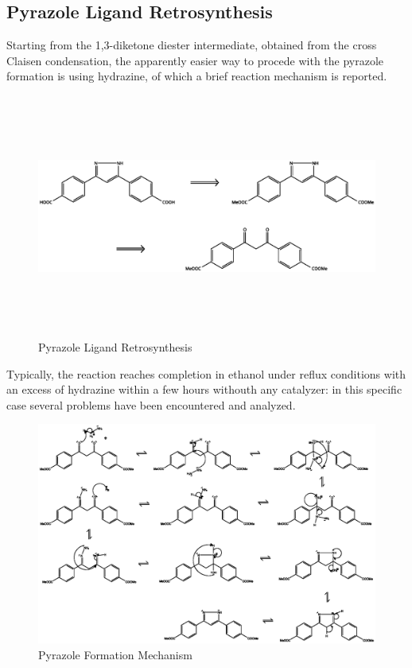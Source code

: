\documentclass[../Master.tex]{subfiles}
\begin{document}
\subsection{Pyrazole Ligand Retrosynthesis}\label{sec:pyrazole-reaction}
Starting from the 1,3-diketone diester intermediate, obtained from the cross Claisen condensation, the apparently easier way to procede with the pyrazole formation is using hydrazine, of which a brief reaction mechanism is reported.

\begin{figure}[h!]
	\centering
	\includegraphics[width=16cm,height=8cm,keepaspectratio]{Structures/pyrazole-retro.eps}
	\caption{Pyrazole Ligand Retrosynthesis}\label{fig:pyrazole-retro}
\end{figure}

Typically, the reaction reaches completion in ethanol under reflux conditions with an excess of hydrazine within a few hours withouth any catalyzer: in this specific case several problems have been encountered and analyzed.\\

\begin{figure}[h!]
	\centering
	\includegraphics[width=15cm,keepaspectratio]{Structures/dikmecha.eps}
	\caption{Pyrazole Formation Mechanism}
\end{figure}
\end{document}
